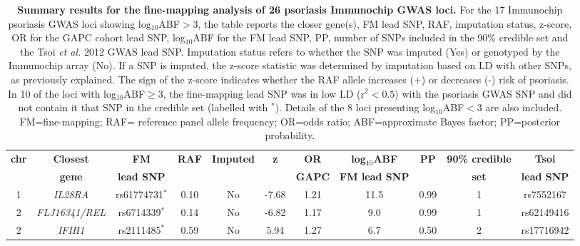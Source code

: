 \begin{landscape}
\renewcommand{\arraystretch}{0.7}
\begin{center}
\begin{longtable}[ht]{c c c c c c c c c c c}
\caption[Summary results for the fine-mapping analysis of 26 psoriasis Immunochip GWAS loci.]{\textbf{Summary results for the fine-mapping analysis of 26 psoriasis Immunochip GWAS loci.} For the 17 Immunochip psoriasis GWAS loci showing log${_10}$ABF$>3$, the table reports the closer gene(s), FM lead SNP, RAF, imputation status, z-score, OR for the GAPC cohort lead SNP, log$_{10}$ABF for the FM lead SNP, PP, number of SNPs included in the 90\% credible set and the Tsoi \textit{et al.} 2012 GWAS lead SNP. Imputation status refers to whether the SNP was imputed (Yes) or genotyped by the Immunochip array (No). If a SNP is imputed, the z-score statistic was determined by imputation based on LD with other SNPs, as previously explained. The sign of the z-score indicates whether the RAF allele increases (+) or decreases (-) risk of psoriasis. In 10 of the loci with log$_{10}$ABF$\geq$3, the fine-mapping lead SNP was in low LD (r${^2}<0.5$) with the psoriasis GWAS SNP and did not contain it that SNP in the credible set (labelled with $^{\ast}$). Details of the 8 loci presenting log${_10}$ABF$<3$ are also included. FM=fine-mapping; RAF= reference panel allele frequency; OR=odds ratio; ABF=approximate Bayes factor; PP=posterior probability.}
\label{tab:Psoriasis_fine_mapping_summary} \\
\toprule
\textbf{chr} & \textbf{Closest} & \textbf{FM} & \textbf{RAF} & \textbf{Imputed}& \textbf{z} &\textbf{OR} & \textbf{log$_{10}$ABF} & \textbf{PP} & \textbf{90\% credible} &\textbf{Tsoi} \\
              & \textbf{gene} & \textbf{lead SNP} &        &                  &           &\textbf{GAPC} & \textbf{FM lead SNP} &             & \textbf{set}           &\textbf{lead SNP} \\
\midrule
\midrule
1	& \textit{IL28RA}&	     rs61774731$^{\ast}$   &		0.10 &	No	& -7.68 &1.21 &		11.5 &		0.99 &		1	 &	rs7552167 \\
2	& \textit{FLJ16341/REL}& rs6714339$^{\ast}$    &		0.14 &	No	& -6.82 &1.17 &		9.0  &		0.99 &		1	 &	rs62149416 \\
2	& \textit{IFIH1}&		     rs2111485$^{\ast}$    &		0.59 &	No	& 5.94  &1.27 &		6.7  &		0.50 &		2	 &	rs17716942 \\

\end{longtable}
\end{center}
\end{landscape}
